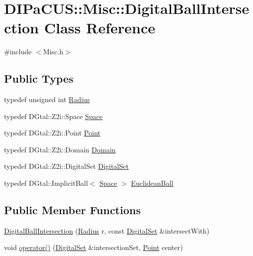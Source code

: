 \hypertarget{classDIPaCUS_1_1Misc_1_1DigitalBallIntersection}{}\section{D\+I\+Pa\+C\+US\+:\+:Misc\+:\+:Digital\+Ball\+Intersection Class Reference}
\label{classDIPaCUS_1_1Misc_1_1DigitalBallIntersection}


{\ttfamily \#include $<$Misc.\+h$>$}

\subsection*{Public Types}
\begin{DoxyCompactItemize}
\item 
typedef unsigned int \hyperlink{classDIPaCUS_1_1Misc_1_1DigitalBallIntersection_a8c17265617201b52046579d379b3e269}{Radius}
\item 
typedef D\+Gtal\+::\+Z2i\+::\+Space \hyperlink{classDIPaCUS_1_1Misc_1_1DigitalBallIntersection_a70219652541b1d322f832184d5f79209}{Space}
\item 
typedef D\+Gtal\+::\+Z2i\+::\+Point \hyperlink{classDIPaCUS_1_1Misc_1_1DigitalBallIntersection_a7e348073cb818df2e225d22746e1d6af}{Point}
\item 
typedef D\+Gtal\+::\+Z2i\+::\+Domain \hyperlink{classDIPaCUS_1_1Misc_1_1DigitalBallIntersection_a23d82ed15613f37ad616a455bcce7542}{Domain}
\item 
typedef D\+Gtal\+::\+Z2i\+::\+Digital\+Set \hyperlink{classDIPaCUS_1_1Misc_1_1DigitalBallIntersection_aaed19d165964a423d69f19a3de0d5587}{Digital\+Set}
\item 
typedef D\+Gtal\+::\+Implicit\+Ball$<$ \hyperlink{classDIPaCUS_1_1Misc_1_1DigitalBallIntersection_a70219652541b1d322f832184d5f79209}{Space} $>$ \hyperlink{classDIPaCUS_1_1Misc_1_1DigitalBallIntersection_aae4ce51777107424826d7f7d4a53eb8a}{Euclidean\+Ball}
\end{DoxyCompactItemize}
\subsection*{Public Member Functions}
\begin{DoxyCompactItemize}
\item 
\hyperlink{classDIPaCUS_1_1Misc_1_1DigitalBallIntersection_ad8f01116b05a8879e0644b57957810d0}{Digital\+Ball\+Intersection} (\hyperlink{classDIPaCUS_1_1Misc_1_1DigitalBallIntersection_a8c17265617201b52046579d379b3e269}{Radius} r, const \hyperlink{classDIPaCUS_1_1Misc_1_1DigitalBallIntersection_aaed19d165964a423d69f19a3de0d5587}{Digital\+Set} \&intersect\+With)
\item 
void \hyperlink{classDIPaCUS_1_1Misc_1_1DigitalBallIntersection_aa7e9ee375a80f5746cfc066666b0615d}{operator()} (\hyperlink{classDIPaCUS_1_1Misc_1_1DigitalBallIntersection_aaed19d165964a423d69f19a3de0d5587}{Digital\+Set} \&intersection\+Set, \hyperlink{classDIPaCUS_1_1Misc_1_1DigitalBallIntersection_a7e348073cb818df2e225d22746e1d6af}{Point} center)
\end{DoxyCompactItemize}
